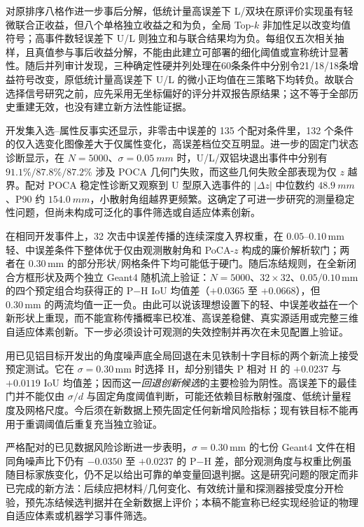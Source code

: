 \documentclass[UTF8,fontset=none,zihao=-4,a4paper]{ctexart}
\begin{document}
对原排序八格作进一步事后分解，低统计量高误差下 L/双块在原评价实现虽有轻微联合正收益，但八个单格独立收益之和为负，全局 Top-$k$ 非加性足以改变均值符号；高事件数轻误差下 U/L 则独立和与联合结果均为负。每组仅五次相关抽样，且真值参与事后收益分解，不能由此建立可部署的细化阈值或宣称统计显著性。随后并列审计发现，三种确定性硬并列处理在60条条件中分别令21/18/18条增益符号改变，原低统计量高误差下 U/L 的微小正均值在三策略下均转负。故联合选择信号研究之前，应先采用无坐标偏好的评分并双报告原结果；这不等于全部历史重建无效，也没有建立新方法性能证据。

开发集入选--属性反事实还显示，非零击中误差的 135 个配对条件里，132 个条件的仅入选变化图像差大于仅属性变化，高误差档位交互明显。进一步的固定门状态诊断显示，在 $N=5000$、$\sigma=\SI{0.05}{mm}$ 时，U/L/双铝块退出事件中分别有 $91.1\%/87.8\%/87.2\%$ 涉及 POCA 几何门失败，而这些几何失败全部表现为仅 $z$ 越界。配对 POCA 稳定性诊断又观察到 U 型原入选事件的 $|\Delta z|$ 中位数约 $\SI{48.9}{mm}$、P90 约 $\SI{154.0}{mm}$，小散射角组越界更频繁。这确定了可进一步研究的测量稳定性问题，但尚未构成可泛化的事件筛选或自适应体素创新。

在相同开发事件上，32 次击中误差传播的连续深度入界权重，在 $0.05$--$0.10\,\mathrm{mm}$ 轻、中误差条件下整体优于仅由观测散射角和 PoCA-$z$ 构成的廉价解析软门；两者在 $0.30\,\mathrm{mm}$ 的部分形状/网格条件下均可能低于硬门。随后冻结规则，在全新闭合方框形状及两个独立 Geant4 随机流上验证：$N=5000$、$32\times32$、$0.05/0.10\,\mathrm{mm}$ 的四个预定组合均获得正的 P$-$H IoU 均值差（$+0.0365$ 至 $+0.0668$），但 $0.30\,\mathrm{mm}$ 的两流均值一正一负。由此可以说该理想设置下的轻、中误差收益在一个新形状上重现，而不能宣称传播概率已校准、高误差稳健、真实源适用或完整三维自适应体素创新。下一步必须设计可观测的失效控制并再次在未见配置上验证。

用已见铝目标开发出的角度噪声底全局回退在未见铁制十字目标的两个新流上接受预定测试。它在 $\sigma=0.30\,\mathrm{mm}$ 时选择 H，却分别错失 P 相对 H 的 $+0.0237$ 与 $+0.0119$ IoU 均值差；因而这一\emph{回退创新候选}的主要检验为阴性。高误差下的最佳门并不能仅由 $\sigma/d$ 与固定角度阈值判断，可能还依赖目标散射强度、低统计量程度及网格尺度。今后须在新数据上预先固定任何新增风险指标；现有铁目标不能再用于重调阈值后重复充当独立验证。

严格配对的已见数据风险诊断进一步表明，$\sigma=0.30\,\mathrm{mm}$ 的七份 Geant4 文件在相同角噪声比下仍有 $-0.0350$ 至 $+0.0237$ 的 P$-$H 差，部分观测角度与权重比例虽随目标家族变化，仍不足以给出可靠的单变量回退判据。这是研究问题的限定而非已完成的新方法：后续应把材料/几何变化、有效统计量和探测器接受度分开检验，预先冻结候选判据并在全新数据上评价；本稿不能宣称已经实现经验证的物理自适应体素或机器学习事件筛选。
\end{document}
